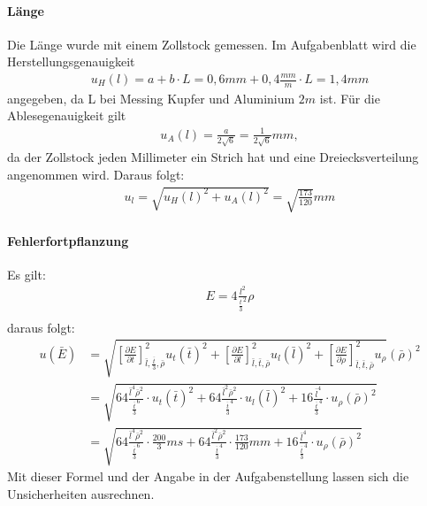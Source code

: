 \documentclass[11pt, a4paper]{article}
\begin{document}
    \paragraph{Länge}
    Die Länge wurde mit einem Zollstock gemessen. Im Aufgabenblatt wird die Herstellungsgenauigkeit
    \begin{align}
        u_H(l) = a+b \cdot L = 0,6mm + 0,4\frac{mm}{m} \cdot L = 1,4mm
    \end{align}
    angegeben, da L bei Messing Kupfer und Aluminium $2m$ ist.
    Für die Ablesegenauigkeit gilt
    \begin{align}
        u_A(l) = \frac{a}{2\sqrt{6}} = \frac{1}{2\sqrt{6}}mm,
    \end{align}
    da der Zollstock jeden Millimeter ein Strich hat und eine Dreiecksverteilung angenommen wird.
    Daraus folgt:
    \begin{align} \label{eql}
        u_l = \sqrt{u_H(l)^2 + u_A(l)^2} = \sqrt{\frac{173}{120}}mm
    \end{align}

    \paragraph{Fehlerfortpflanzung}
    Es gilt:
    \begin{align}
        E = 4\frac{l^2}{\frac{t}{3}^2} \rho \\
    \end{align}
    daraus folgt:
    \begin{align}
        u(\bar{E}) &= \sqrt{\left[\frac{\partial E}{\partial t}\right]^2_{\bar{l}, \frac{\bar{t}}{3}, \bar{\rho}} u_{t}(\bar{t})^2 +
        \left[\frac{\partial E}{\partial l}\right]^2_{\bar{l}, \bar{t}, \bar{\rho}} u_{l}(\bar{l})^2 +
        \left[\frac{\partial E}{\partial \rho}\right]^2_{\bar{l}, \bar{t}, \bar{\rho}} u_{\rho}}(\bar{\rho})^2 \nonumber \\
        &= \sqrt{64 \frac{\bar{l}^4 \bar{\rho}^2}{\frac{\bar{t}}{3}^6} \cdot u_t(\bar{t})^2 +
        64 \frac{\bar{l}^2 \bar{\rho}^2}{\frac{\bar{t}}{3}^4} \cdot u_l(\bar{l})^2 +
        16 \frac{\bar{l}^4}{\frac{\bar{t}}{3}^4} \cdot u_{\rho}(\bar{\rho})^2
        } \nonumber \\
        &= \sqrt{64 \frac{\bar{l}^4 \bar{\rho}^2}{\frac{\bar{t}}{3}^6} \cdot \frac{200}{3}ms +
        64 \frac{\bar{l}^2 \bar{\rho}^2}{\frac{\bar{t}}{3}^4} \cdot \frac{173}{120}mm +
        16 \frac{\bar{l}^4}{\frac{\bar{t}}{3}^4} \cdot u_{\rho}(\bar{\rho})^2
        }
    \end{align}
    Mit dieser Formel und der Angabe in der Aufgabenstellung lassen
    sich die Unsicherheiten ausrechnen.
\end{document}
